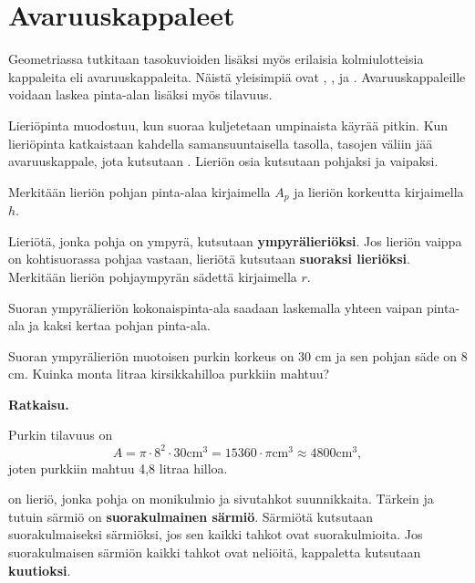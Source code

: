 \section*{Avaruuskappaleet}
Geometriassa tutkitaan tasokuvioiden lisäksi myös erilaisia kolmiulotteisia kappaleita eli avaruuskappaleita. Näistä yleisimpiä ovat , ,  ja . Avaruuskappaleille voidaan laskea pinta-alan lisäksi myös tilavuus.


Lieriöpinta muodostuu, kun suoraa kuljetetaan umpinaista käyrää pitkin. Kun lieriöpinta katkaistaan kahdella samansuuntaisella tasolla, tasojen väliin jää avaruuskappale, jota kutsutaan . Lieriön osia kutsutaan pohjaksi ja vaipaksi.

Merkitään lieriön pohjan pinta-alaa kirjaimella $A_p$ ja lieriön korkeutta kirjaimella $h$.


Lieriötä, jonka pohja on ympyrä, kutsutaan \textbf{ympyrälieriöksi}. Jos lieriön vaippa on kohtisuorassa pohjaa vastaan, lieriötä kutsutaan \textbf{suoraksi lieriöksi}. Merkitään lieriön pohjaympyrän sädettä kirjaimella $r$.


Suoran ympyrälieriön kokonaispinta-ala saadaan laskemalla yhteen vaipan pinta-ala ja kaksi kertaa pohjan pinta-ala.


\begin{esimerkki}
Suoran ympyrälieriön muotoisen purkin korkeus on 30 cm ja sen pohjan säde on 8 cm. Kuinka monta litraa kirsikkahilloa purkkiin mahtuu?

\textbf{Ratkaisu.}

Purkin tilavuus on
$$A=\pi\cdot 8^2 \cdot 30 \text{cm}^3 = 15360 \cdot \pi \text{cm}^3 \approx 4800 \text{cm}^3,$$
joten purkkiin mahtuu 4,8 litraa hilloa.
\end{esimerkki}

 on lieriö, jonka pohja on monikulmio ja sivutahkot suunnikkaita.
Tärkein ja tutuin särmiö on \textbf{suorakulmainen särmiö}.
Särmiötä kutsutaan suorakulmaiseksi särmiöksi, jos sen kaikki tahkot ovat suorakulmioita. Jos suorakulmaisen särmiön kaikki tahkot ovat neliöitä, kappaletta kutsutaan \textbf{kuutioksi}.

